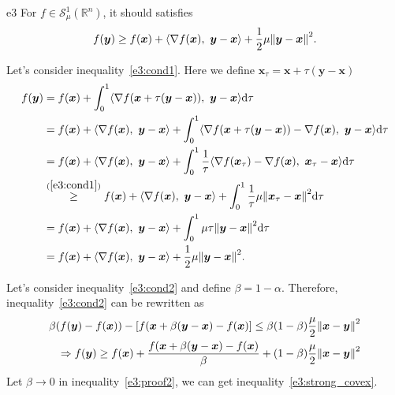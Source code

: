\documentclass{article}
\newcommand{\R}{\mathbb{R}}
\newcommand{\xB}{\bm{x}}
\renewcommand{\grad}{\nabla}
\newcommand{\yB}{\bm{y}}
\newcommand{\SM}{\mathcal{S}}
\newcommand{\strongconvextype}[2]{\SM_{#1}^{#2}(\R^n)}
\begin{document}
\begin{PROOF}{e3}
    For \(f \in \strongconvextype{\mu}{1}\), it should satisfies
    \begin{equation}\label{e3:strong_covex}
        f(\yB) \ge f(\xB) + \innerprod{\grad f(\xB)}{\yB - \xB} + \frac{1}{2} \mu\norm{\yB - \xB}^2.
    \end{equation}

    Let's consider inequality~\ref{e3:cond1}. Here we define \(\xB_\tau = \xB + \tau (\yB - \xB)\)
    \begin{equation}\label{e3:proof1_1}
        \begin{aligned}
            f(\yB) &= f(\xB) + \int_0^1 \innerprod{\grad f(\xB + \tau (\yB - \xB))}{\yB - \xB} \dd \tau\\
            &= f(\xB) + \innerprod{\grad f(\xB)}{\yB - \xB} + \int_0^1 \innerprod{\grad f(\xB + \tau (\yB - \xB)) - \grad f(\xB)}{\yB - \xB} \dd \tau\\
            &= f(\xB) + \innerprod{\grad f(\xB)}{\yB - \xB} + \int_0^1 \frac{1}{\tau} \innerprod{\grad f(\xB_\tau) - \grad f(\xB)}{\xB_\tau - \xB} \dd \tau\\
            &\overset{(\ref{e3:cond1})}{\ge} f(\xB) + \innerprod{\grad f(\xB)}{\yB - \xB} + \int_0^1 \frac{1}{\tau} \mu \norm{\xB_\tau - \xB}^2 \dd \tau\\
            &= f(\xB) + \innerprod{\grad f(\xB)}{\yB - \xB} + \int_0^1 \mu \tau \norm{\yB - \xB}^2 \dd \tau\\
            &=f(\xB) + \innerprod{\grad f(\xB)}{\yB - \xB} + \frac{1}{2} \mu\norm{\yB - \xB}^2.
        \end{aligned}
    \end{equation}

    Let's consider inequality~\ref{e3:cond2} and define \(\beta = 1 - \alpha\). Therefore, inequality~\ref{e3:cond2} can be rewritten as
    \begin{equation}\label{e3:proof2}
        \begin{aligned}
            \beta (f(\yB) - f(\xB)) - [f(\xB + \beta (\yB - \xB) - f(\xB)] \le \beta (1-\beta) \frac{\mu}{2} \norm{\xB - \yB}^2 \\
            \Rightarrow f(\yB) \ge f(\xB) + \frac{f(\xB + \beta (\yB - \xB) - f(\xB)}{\beta} + (1-\beta)\frac{\mu}{2} \norm{\xB - \yB}^2
        \end{aligned}
    \end{equation}
    Let \(\beta \to 0\) in inequality~\ref{e3:proof2}, we can get inequality~\ref{e3:strong_covex}.
\end{PROOF}
\end{document}
